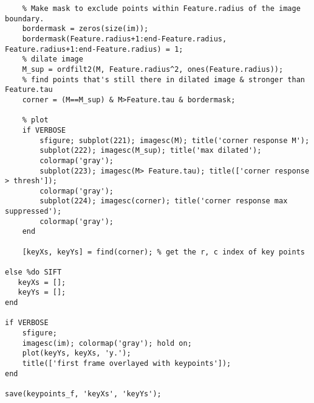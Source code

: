 \begin{verbatim}
    % Make mask to exclude points within Feature.radius of the image boundary. 
    bordermask = zeros(size(im));
    bordermask(Feature.radius+1:end-Feature.radius, Feature.radius+1:end-Feature.radius) = 1;
    % dilate image
    M_sup = ordfilt2(M, Feature.radius^2, ones(Feature.radius));
    % find points that's still there in dilated image & stronger than Feature.tau
    corner = (M==M_sup) & M>Feature.tau & bordermask;

    % plot
    if VERBOSE
        sfigure; subplot(221); imagesc(M); title('corner response M');
        subplot(222); imagesc(M_sup); title('max dilated');
        colormap('gray');
        subplot(223); imagesc(M> Feature.tau); title(['corner response > thresh']);
        colormap('gray');
        subplot(224); imagesc(corner); title('corner response max suppressed');
        colormap('gray');
    end

    [keyXs, keyYs] = find(corner); % get the r, c index of key points

else %do SIFT
   keyXs = [];
   keyYs = [];
end

if VERBOSE
    sfigure;
    imagesc(im); colormap('gray'); hold on;
    plot(keyYs, keyXs, 'y.');
    title(['first frame overlayed with keypoints']);
end

save(keypoints_f, 'keyXs', 'keyYs');
\end{verbatim}
